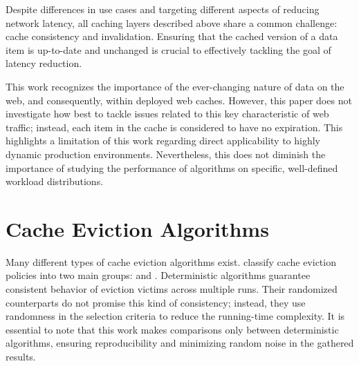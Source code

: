 Despite differences in use cases and targeting different aspects of reducing network latency, all caching layers described above share a common challenge: cache consistency and invalidation. Ensuring that the cached version of a data item is up-to-date and unchanged is crucial to effectively tackling the goal of latency reduction.

This work recognizes the importance of the ever-changing nature of data on the web, and consequently, within deployed web caches. However, this paper does not investigate how best to tackle issues related to this key characteristic of web traffic; instead, each item in the cache is considered to have no expiration. This highlights a limitation of this work regarding direct applicability to highly dynamic production environments. Nevertheless, this does not diminish the importance of studying the performance of algorithms on specific, well-defined workload distributions.


\section{Cache Eviction Algorithms}


Many different types of cache eviction algorithms exist. \citeauthor{web-cache-overview} \cite{web-cache-overview} classify cache eviction policies into two main groups:  and . Deterministic algorithms guarantee consistent behavior of eviction victims across multiple runs. Their randomized counterparts do not promise this kind of consistency; instead, they use randomness in the selection criteria to reduce the running-time complexity. It is essential to note that this work makes comparisons only between deterministic algorithms, ensuring reproducibility and minimizing random noise in the gathered results.



